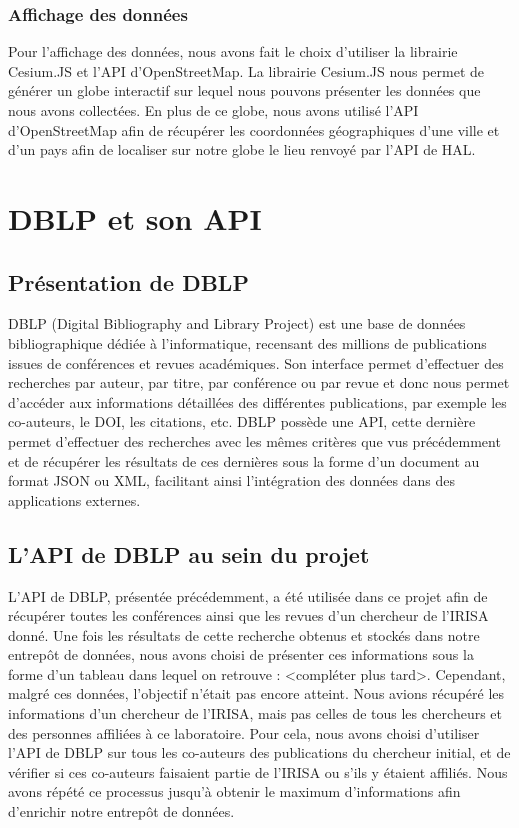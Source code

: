 \documentclass[a4paper,12pt]{article}
\begin{document}
\subsubsection{Affichage des données}
Pour l'affichage des données, nous avons fait le choix d'utiliser la librairie Cesium.JS et l'API d'OpenStreetMap. La librairie Cesium.JS nous permet de générer un globe interactif sur lequel nous pouvons présenter les données que nous avons collectées. En plus de ce globe, nous avons
utilisé l'API d'OpenStreetMap afin de récupérer les coordonnées géographiques d'une ville et d'un pays afin de localiser sur notre globe le lieu renvoyé par l'API de HAL.


\section{DBLP et son API}

\subsection{Présentation de DBLP}
DBLP (Digital Bibliography and Library Project) est une base de données bibliographique dédiée à l’informatique, recensant des millions de publications issues de conférences et revues académiques. 
Son interface permet d’effectuer des recherches par auteur, par titre, par conférence ou par revue et donc nous permet d'accéder aux informations détaillées des différentes publications, par exemple les co-auteurs, le DOI, 
les citations, etc. DBLP possède une API, cette dernière permet d'effectuer des recherches avec les mêmes critères que vus précédemment et de récupérer les résultats de ces dernières sous la forme d'un document au format JSON ou XML,
facilitant ainsi l'intégration des données dans des applications externes.

\subsection{L'API de DBLP au sein du projet}
L'API de DBLP, présentée précédemment, a été utilisée dans ce projet afin de récupérer toutes les conférences ainsi que les revues d'un chercheur de l'IRISA donné. Une fois les résultats de cette recherche obtenus et stockés dans notre entrepôt de données, 
nous avons choisi de présenter ces informations sous la forme d'un tableau dans lequel on retrouve : <compléter plus tard>. Cependant, malgré ces données, l'objectif n'était pas encore atteint. Nous avions récupéré les informations d'un chercheur de l'IRISA, 
mais pas celles de tous les chercheurs et des personnes affiliées à ce laboratoire. Pour cela, nous avons choisi d'utiliser l'API de DBLP sur tous les co-auteurs des publications du chercheur initial, et de vérifier si ces co-auteurs faisaient partie de l'IRISA 
ou s'ils y étaient affiliés. Nous avons répété ce processus jusqu'à obtenir le maximum d'informations afin d'enrichir notre entrepôt de données.
\end{document}
